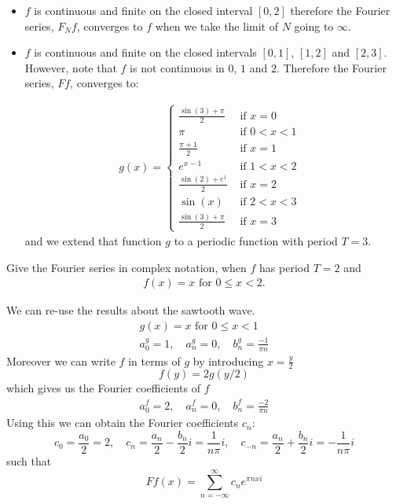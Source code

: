 \documentclass[11pt]{article}
\begin{document}
\begin{solution}     
\begin{itemize}
\item $f$ is continuous and finite on the closed interval $[0,2]$ therefore the Fourier series, $F_N f$, converges to $f$ when we take the limit of $N$ going to $\infty$.
\item $f$ is continuous and finite on the closed intervals $[0,1]$, $[1,2]$ and $[2,3]$. 
However, note that $f$ is not continuous in $0$, $1$ and $2$.
Therefore the Fourier series, $F f$, converges to: 

\begin{gather*}
            g(x) = \left\{\begin{array}{ll}
                            \frac{\sin(3) + \pi}{2} & \text{ if $x = 0$ }
						\\
                            \pi   & \text{ if $0 < x < 1$ }
                            \\
                            \frac{\pi + 1}{2} & \text{ if $x = 1$ }
						\\
                            e^{x-1} & \text{ if $1 < x < 2$ }
						\\
                            \frac{\sin(2) + e^1}{2} & \text{ if $x = 2$ }
						\\
                            \sin(x) & \text{ if $2 < x < 3$ }
						\\
                            \frac{\sin(3) + \pi}{2} & \text{ if $x = 3$ }
                          \end{array}\right.
\end{gather*}
and we extend that function $g$ to a periodic function with period $T = 3$. 
\end{itemize}
\end{solution}

\begin{exercise}
    Give the Fourier series in complex notation, when $f$ has period $T = 2$ and 
    \begin{gather*}
        f(x) = x \text{ for } 0 \leq x < 2.
    \end{gather*}
\end{exercise}
\begin{solution}     
We can re-use the results about the sawtooth wave.
\begin{gather*}
    g(x)=x \text { for } 0 \leq x<1
    \\
    a_0^g = 1,\quad a_n^g = 0, \quad b_n^g = \frac{-1}{\pi n}
\end{gather*}
Moreover we can write $f$ in terms of $g$ by introducing $x = \frac{y}{2}$
\[
    f(y) = 2g(y/2)
\]
which gives us the Fourier coefficients of $f$
\begin{gather*}
    a_0^f = 2,\quad a_n^f = 0, \quad b_n^f = \frac{-2}{\pi n}
\end{gather*}
Using this we can obtain the Fourier coefficients $c_n$:
\[
    c_0 = \frac{ a_0 }{2} = 2,\quad c_n=\frac{a_n}{2}-\frac{b_n}{2} i = \frac{1}{n\pi}i, \quad c_{-n}=\frac{a_n}{2}+\frac{b_n}{2} i = -\frac{1}{n\pi}i
\]
such that 
\[
    F f(x)=\sum_{n=-\infty}^{\infty} c_n e^{\pi n x i}
\]
\end{solution}
\end{document}
